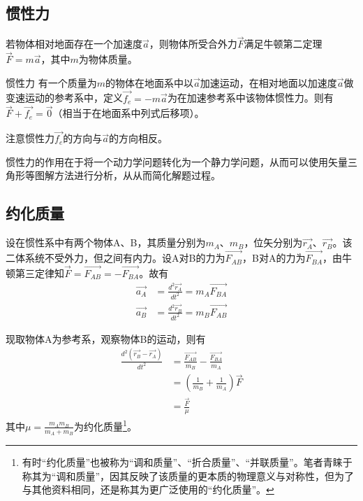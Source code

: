 \subsection{惯性力}
\label{s_gxl}

若物体相对地面存在一个加速度$\vec{a}$，则物体所受合外力$\vec{F}$满足牛顿第二定理$\vec{F}=m \vec{a}$，其中$m$为物体质量。

\begin{defi}{惯性力}{}
有一个质量为$m$的物体在地面系中以$\vec{a}$加速运动，在相对地面以加速度$\vec{a}$做变速运动的参考系中，定义$\vec{f_e}=-m \vec{a}$为在加速参考系中该物体惯性力。则有$\vec{F}+\vec{f_e} = \vec{0}$（相当于在地面系中列式后移项）。

注意惯性力$\vec{f_e}$的方向与$\vec{a}$的方向相反。
\end{defi}

惯性力的作用在于将一个动力学问题转化为一个静力学问题，从而可以使用矢量三角形等图解方法进行分析，从从而简化解题过程。

\subsection{约化质量}
\label{s_yhzl}

设在惯性系中有两个物体A、B，其质量分别为$m_A$、$m_B$，位矢分别为$\vec{r_A}$、$\vec{r_B}$。该二体系统不受外力，但之间有内力。设A对B的力为$\vec{F_{AB}}$，B对A的力为$\vec{F_{BA}}$，由牛顿第三定律知$\vec{F} = \vec{F_{AB}} = - \vec{F_{BA}}$。故有
\begin{subequations}
\begin{align*}
\vec{a_A} &= \frac{d^2 \vec{r_A}}{d t^2} = m_A \vec{F_{BA}}  \\
\vec{a_B} &= \frac{d^2 \vec{r_B}}{d t^2} = m_B \vec{F_{AB}}  
\end{align*}
\end{subequations}

现取物体A为参考系，观察物体B的运动，则有
\begin{subequations}
\begin{align*}
\frac{d^2 (\vec{r_B} - \vec{r_A})}{d t^2} &= \frac{\vec{F_{AB}}}{m_B} - \frac{\vec{F_{BA}}}{m_A} \\
&= (\frac{1}{m_B} + \frac{1}{m_A}) \vec{F} \\
&= \frac{\vec{F}}{\mu}
\end{align*}
\end{subequations}
其中$\mu = \frac{m_A m_B}{m_A + m_B}$为约化质量\footnote{有时“约化质量”也被称为“调和质量”、“折合质量”、“并联质量”。笔者青睐于称其为“调和质量”，因其反映了该质量的更本质的物理意义与对称性，但为了与其他资料相同，还是称其为更广泛使用的“约化质量”。}。

